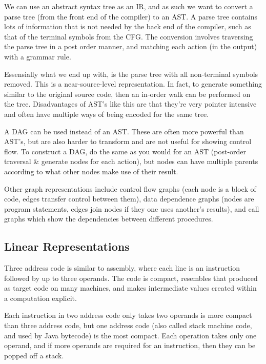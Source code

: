 We can use an abstract syntax tree as an IR, and as such we want to
convert a parse tree (from the front end of the compiler) to an AST. A
parse tree contains lots of information that is not needed by the back
end of the compiler, such as that of the terminal symbols from the
CFG. The conversion involves traversing the parse tree in a post order
manner, and matching each action (in the output) with a grammar rule.


Essensially what we end up with, is the parse tree with all
non-terminal symbols removed. This is a near-source-level
representation. In fact, to generate something similar to the original
source code, then an in-order walk can be performed on the
tree. Disadvantages of AST's like this are that they're very pointer
intensive and often have multiple ways of being encoded for the same
tree.

A DAG can be used instead of an AST. These are often more powerful
than AST's, but are also harder to transform and are not useful for
showing control flow. To construct a DAG, do the same as you would for
an AST (post-order traversal \& generate nodes for each action), but
nodes can have multiple parents according to what other nodes make use
of their result.

Other graph representations include control flow graphs (each node is
a block of code, edges transfer control between them), data dependence
graphs (nodes are program statements, edges join nodes if they one
uses another's results), and call graphs which show the dependencies
between different procedures.


\subsection{Linear Representations}

Three address code is similar to assembly, where each line is an
instruction followed by up to three operands. The code is compact,
resembles that produced as target code on many machines, and makes
intermediate values created within a computation explicit.

Each instruction in two address code only takes two operands is more
compact than three address code, but one address code (also called
stack machine code, and used by Java bytecode) is the most
compact. Each operation takes only one operand, and if more operands
are required for an instruction, then they can be popped off a stack.

